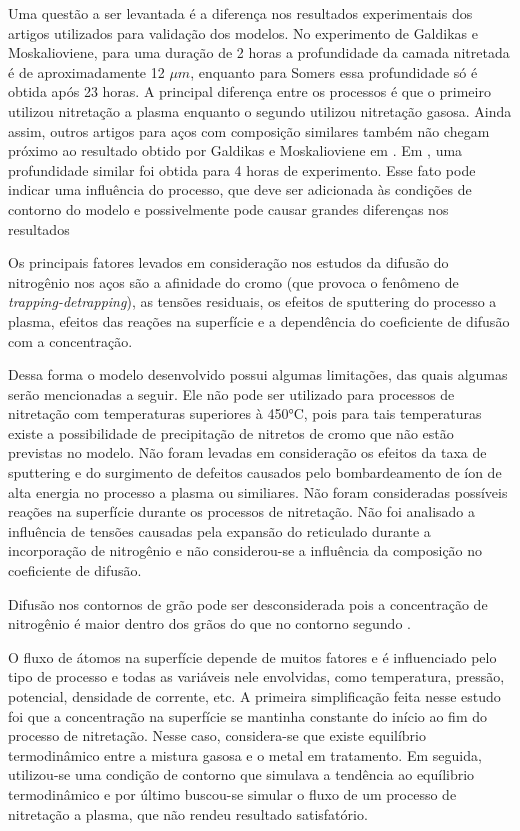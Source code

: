 Uma questão a ser levantada é a diferença nos resultados experimentais dos artigos utilizados para validação dos modelos. No experimento de Galdikas e Moskalioviene, para uma duração de 2 horas a profundidade da camada nitretada é de aproximadamente   12 $\mu m$, enquanto para Somers essa profundidade só é obtida após 23 horas. A principal diferença entre os processos é que o primeiro utilizou nitretação a plasma enquanto o segundo utilizou nitretação gasosa.  Ainda assim, outros artigos para aços com composição similares também não chegam próximo ao resultado obtido por Galdikas e Moskalioviene em \cite{moskalioviene2011modeling}. Em \cite{galdikas2011modeling}, uma profundidade similar foi obtida para 4 horas de experimento. Esse fato pode indicar uma influência do processo, que deve ser adicionada às condições de contorno do modelo e possivelmente pode causar grandes diferenças nos resultados

Os principais fatores levados em consideração nos estudos da difusão do nitrogênio nos aços são a afinidade do cromo (que provoca o fenômeno de \textit{trapping-detrapping}), as tensões residuais, os efeitos de sputtering do processo a plasma, efeitos das reações na superfície e a dependência do coeficiente de difusão com a concentração.

Dessa forma o modelo desenvolvido possui algumas limitações, das quais algumas serão mencionadas a seguir. Ele não pode ser utilizado para processos de nitretação com temperaturas superiores à 450°C, pois para tais temperaturas existe a possibilidade de precipitação de nitretos de cromo que não estão previstas no modelo. Não foram levadas em consideração os efeitos da taxa de sputtering e do surgimento de defeitos causados pelo bombardeamento de íon de alta energia no processo a plasma ou similiares. Não foram consideradas possíveis reações na superfície durante os processos de nitretação. Não foi analisado a influência de tensões causadas pela expansão do reticulado durante a incorporação de nitrogênio e não considerou-se a influência da composição no coeficiente de difusão.

Difusão nos contornos de grão pode ser desconsiderada pois a concentração de nitrogênio é maior dentro dos grãos do que no contorno segundo \cite{parascandola2000nitrogen}.

O fluxo de átomos na superfície depende de muitos fatores e é influenciado pelo tipo de processo e todas as variáveis nele envolvidas, como temperatura, pressão, potencial, densidade de corrente, etc.
A primeira simplificação feita nesse estudo foi que a concentração na superfície se mantinha constante do início ao fim do processo de nitretação. Nesse caso, considera-se que existe equilíbrio termodinâmico entre a  mistura gasosa e o metal em tratamento. Em seguida, utilizou-se uma condição de contorno que simulava a  tendência ao equílibrio termodinâmico e por último buscou-se simular o fluxo de um processo de nitretação a plasma, que não rendeu resultado satisfatório.
 
